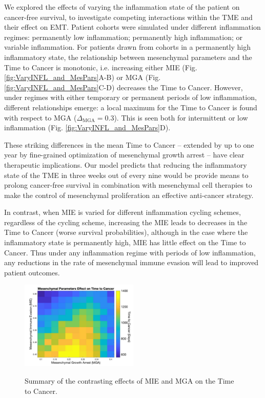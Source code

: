 \documentclass[11pt]{article}
\begin{document}
We explored the effects of varying the inflammation state of the patient on cancer-free survival, to investigate competing interactions within the TME and their effect on EMT. Patient cohorts were simulated under different inflammation regimes: permanently low inflammation; permanently high inflammation; or variable inflammation. For patients drawn from cohorts in a permanently high inflammatory state, the relationship between mesenchymal parameters and the Time to Cancer is monotonic, i.e. increasing either MIE (Fig. \ref{fig:VaryINFL_and_MesPars}A-B) or MGA (Fig. \ref{fig:VaryINFL_and_MesPars}C-D) decreases the Time to Cancer.
However, under regimes with either temporary or permanent periods of low inflammation, different relationships emerge: a local maximum for the Time to Cancer is found with respect to MGA ($\Delta_\text{MGA}= 0.3$). This is seen both for intermittent or low inflammation (Fig. \ref{fig:VaryINFL_and_MesPars}D). 
\par
These striking differences in the mean Time to Cancer -- extended by up to one year by fine-grained optimization of mesenchymal growth arrest -- have clear therapeutic implications. 
Our model predicts that reducing the inflammatory state of the TME in three weeks out of every nine would be provide means to prolong cancer-free survival in combination with mesenchymal cell therapies to make the control of mesenchymal proliferation an effective anti-cancer strategy.
\par
In contrast, when MIE is varied for different inflammation cycling schemes, regardless of the cycling scheme, increasing the MIE leads to decreases in the Time to Cancer (worse survival probabilities), although in the case where the inflammatory state is permanently high, MIE has little effect on the Time to Cancer. Thus under any inflammation regime with periods of low inflammation, any reductions in the rate of mesenchymal immune evasion will lead to improved patient outcomes.


\begin{figure}
\center
{\includegraphics[width=0.5\textwidth]{Figure5/MIEvsMGA_bigcbar.jpg}}
\caption{Summary of the contrasting effects of MIE and MGA on the Time to Cancer.
}
\label{fig:MIEvsMGA}
\end{figure}
\end{document}
